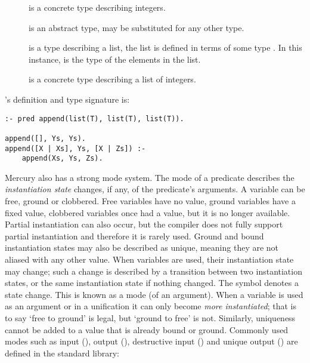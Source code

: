 \begin{description}

    \item[] is a concrete type describing integers.

    \item[] is an abstract type,  may be substituted for any other
    type.

    \item[] is a type describing a list, the list is defined
    in terms of some type .
    In this instance,  is the type of the elements in the list.

    \item[] is a concrete type describing a list of
    integers.

\end{description}

\noindent
{}'s definition and type signature is:

\begin{verbatim}
:- pred append(list(T), list(T), list(T)).

append([], Ys, Ys).
append([X | Xs], Ys, [X | Zs]) :-
    append(Xs, Ys, Zs).
\end{verbatim}

\noindent
Mercury also has a strong mode system.
The mode of a predicate describes the \emph{instantiation state} changes,
if any, of the predicate's arguments.
A variable can be free, ground or clobbered.
Free variables have no value,
ground variables have a fixed value,
clobbered variables once had a value, but it is no longer available.
Partial instantiation can also occur,
but the compiler does not fully support partial instantiation
and therefore it is rarely used.
Ground and bound instantiation states may also be described as unique,
meaning they are not aliased with any other value.
When variables are used, their instantiation state may change;
such a change is described by a transition between two instantiation states,
or the same instantiation state if nothing changed.
The symbol \code{>>} denotes a state change.
This is known as a mode (of an argument).
When a variable is used as an argument or in a unification it can only
become \emph{more instantiated};
that is to say `free to ground' is legal, but `ground to free' is not.
Similarly, uniqueness cannot be added to a value that is already
bound or ground.
Commonly used modes such as input (), output (),
destructive input () and unique output () are
defined in the standard library:

